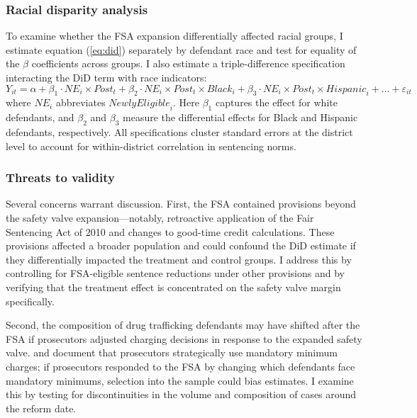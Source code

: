 \documentclass[12pt]{article}
\begin{document}
\subsubsection*{Racial disparity analysis}
To examine whether the FSA expansion differentially affected racial groups, I estimate equation (\ref{eq:did}) separately by defendant race and test for equality of the $\beta$ coefficients across groups. I also estimate a triple-difference specification interacting the DiD term with race indicators:
\begin{equation}
Y_{it} = \alpha + \beta_1 \cdot \mathit{NE}_i \times \mathit{Post}_t + \beta_2 \cdot \mathit{NE}_i \times \mathit{Post}_t \times \mathit{Black}_i + \beta_3 \cdot \mathit{NE}_i \times \mathit{Post}_t \times \mathit{Hispanic}_i + \ldots + \varepsilon_{it}
\label{eq:ddd}
\end{equation}
where $\mathit{NE}_i$ abbreviates $\mathit{NewlyEligible}_i$. Here $\beta_1$ captures the effect for white defendants, and $\beta_2$ and $\beta_3$ measure the differential effects for Black and Hispanic defendants, respectively. All specifications cluster standard errors at the district level to account for within-district correlation in sentencing norms.

\subsubsection*{Threats to validity}
Several concerns warrant discussion. First, the FSA contained provisions beyond the safety valve expansion---notably, retroactive application of the Fair Sentencing Act of 2010 and changes to good-time credit calculations. These provisions affected a broader population and could confound the DiD estimate if they differentially impacted the treatment and control groups. I address this by controlling for FSA-eligible sentence reductions under other provisions and by verifying that the treatment effect is concentrated on the safety valve margin specifically.

Second, the composition of drug trafficking defendants may have shifted after the FSA if prosecutors adjusted charging decisions in response to the expanded safety valve. \citet{rehavi2014racial} and \citet{tuttle2019snitch} document that prosecutors strategically use mandatory minimum charges; if prosecutors responded to the FSA by changing which defendants face mandatory minimums, selection into the sample could bias estimates. I examine this by testing for discontinuities in the volume and composition of cases around the reform date.
\end{document}
